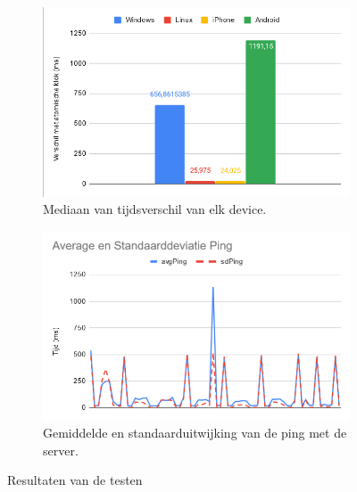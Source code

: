 \begin{figure}[H]
	\centering
	\begin{subfigure}{.5\textwidth}
		\centering
		\includegraphics[width=.95\linewidth]{img/mediaan.png}
		\caption{Mediaan van tijdsverschil van elk device.}
		\label{fig:mediaan}
	\end{subfigure}%
	\begin{subfigure}{.5\textwidth}
		\centering
		\includegraphics[width=.95\linewidth]{img/ping_results.png}
		\caption{Gemiddelde en standaarduitwijking van de ping met de server. }
		\label{fig:avgPing}
	\end{subfigure}
	\caption{Resultaten van de testen}
	\label{fig:results}
\end{figure}


















